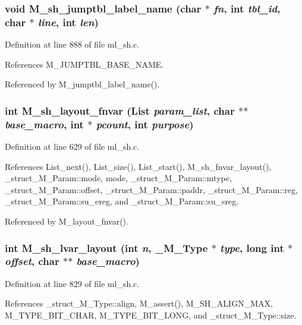 \subsubsection{\setlength{\rightskip}{0pt plus 5cm}void M\_\-sh\_\-jumptbl\_\-label\_\-name (char $\ast$ {\em fn}, int {\em tbl\_\-id}, char $\ast$ {\em line}, int {\em len})}\label{ml__sh_8c_57ef07dfc1f52b28ef9ab0be4b0c8046}




Definition at line 888 of file ml\_\-sh.c.

References M\_\-JUMPTBL\_\-BASE\_\-NAME.

Referenced by M\_\-jumptbl\_\-label\_\-name().
\subsubsection{\setlength{\rightskip}{0pt plus 5cm}int M\_\-sh\_\-layout\_\-fnvar (\bf{List} {\em param\_\-list}, char $\ast$$\ast$ {\em base\_\-macro}, int $\ast$ {\em pcount}, int {\em purpose})}\label{ml__sh_8c_21bdc6be810e4aa377bc8734303ba126}




Definition at line 629 of file ml\_\-sh.c.

References List\_\-next(), List\_\-size(), List\_\-start(), M\_\-sh\_\-fnvar\_\-layout(), \_\-struct\_\-M\_\-Param::mode, mode, \_\-struct\_\-M\_\-Param::mtype, \_\-struct\_\-M\_\-Param::offset, \_\-struct\_\-M\_\-Param::paddr, \_\-struct\_\-M\_\-Param::reg, \_\-struct\_\-M\_\-Param::su\_\-ereg, and \_\-struct\_\-M\_\-Param::su\_\-sreg.

Referenced by M\_\-layout\_\-fnvar().
\subsubsection{\setlength{\rightskip}{0pt plus 5cm}int M\_\-sh\_\-lvar\_\-layout (int {\em n}, \bf{\_\-M\_\-Type} $\ast$ {\em type}, long int $\ast$ {\em offset}, char $\ast$$\ast$ {\em base\_\-macro})}\label{ml__sh_8c_79ec1e4dda5ba4cbe92f9990b61a6e19}




Definition at line 829 of file ml\_\-sh.c.

References \_\-struct\_\-M\_\-Type::align, M\_\-assert(), M\_\-SH\_\-ALIGN\_\-MAX, M\_\-TYPE\_\-BIT\_\-CHAR, M\_\-TYPE\_\-BIT\_\-LONG, and \_\-struct\_\-M\_\-Type::size.

